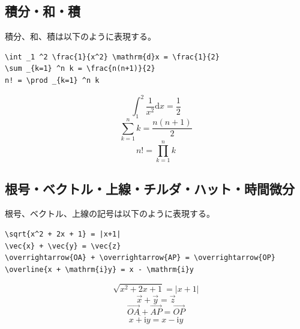 \subsection{積分・和・積}
\label{sec:latex:integration}

積分、和、積は以下のように表現する。
\begin{reidai}
\begin{verbatim}
\int _1 ^2 \frac{1}{x^2} \mathrm{d}x = \frac{1}{2}
\sum _{k=1} ^n k = \frac{n(n+1)}{2}
n! = \prod _{k=1} ^n k
\end{verbatim}
\end{reidai}
\vspace*{-1.5em}
\begin{kekka}
  \begin{equation*}
    \int _1 ^2 \frac{1}{x^2} \mathrm{d}x = \frac{1}{2}
  \end{equation*}
  \begin{equation*}
    \sum _{k=1} ^n k = \frac{n(n+1)}{2}
  \end{equation*}
  \begin{equation*}
    n! = \prod _{k=1} ^n k
  \end{equation*}
\end{kekka}

\subsection{根号・ベクトル・上線・チルダ・ハット・時間微分}
\label{sec:latex:root}

根号、ベクトル、上線の記号は以下のように表現する。
\begin{reidai}
\begin{verbatim}
\sqrt{x^2 + 2x + 1} = |x+1|
\vec{x} + \vec{y} = \vec{z}
\overrightarrow{OA} + \overrightarrow{AP} = \overrightarrow{OP}
\overline{x + \mathrm{i}y} = x - \mathrm{i}y
\end{verbatim}
\end{reidai}
\vspace*{-1.5em}
\begin{kekka}
  \begin{equation*}
    \sqrt{x^2 + 2x + 1} = |x+1|
  \end{equation*}
  \begin{equation*}
    \vec{x} + \vec{y} = \vec{z}
  \end{equation*}
  \begin{equation*}
    \overrightarrow{OA} + \overrightarrow{AP} = \overrightarrow{OP}
  \end{equation*}
  \begin{equation*}
    \overline{x + \mathrm{i}y} = x - \mathrm{i}y
  \end{equation*}
  \vspace{0pt}
\end{kekka}

